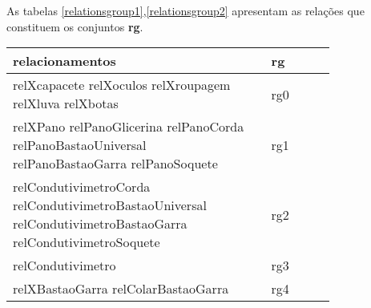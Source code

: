 As tabelas \ref{relationsgroup1},\ref{relationsgroup2} apresentam as relações que constituem os conjuntos \textbf{rg}.
\begin{table}[H]
\centering
{}
\begin{tabular}{|p{0.8\linewidth}|l|}
\hline
\textbf{relacionamentos}                                                                                                                                                                                                                                                                                                                  & \textbf{rg} \\ \hline
relXcapacete relXoculos relXroupagem relXluva relXbotas                                                                                                                                                                                                                                                                                   & rg0         \\ \hline
relXPano relPanoGlicerina relPanoCorda relPanoBastaoUniversal relPanoBastaoGarra relPanoSoquete                                                                                                                                                                                                                                           & rg1         \\ \hline
relCondutivimetroCorda relCondutivimetroBastaoUniversal relCondutivimetroBastaoGarra relCondutivimetroSoquete                                                                                                                                                                                                                                & rg2         \\ \hline
relCondutivimetro                                                                                                                                                                                                                                                                                                                         & rg3         \\ \hline
relXBastaoGarra relColarBastaoGarra                                                                                                                                                                                                                                                                                                      & rg4         \\ \hline

\end{tabular}
\end{table}
